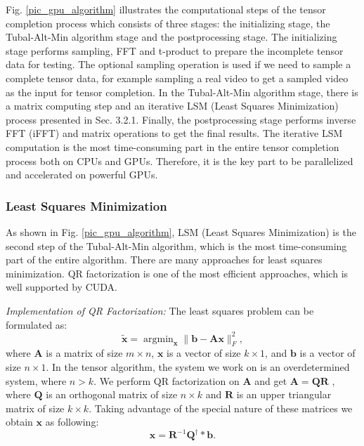 \documentclass[format=acmsmall, review=false, screen=true]{acmart}
\begin{document}
Fig. \ref{pic_gpu_algorithm} illustrates the computational steps of the tensor completion process which consists of three stages: the initializing stage, the Tubal-Alt-Min algorithm stage and the postprocessing stage. The initializing stage performs sampling, FFT and t-product to prepare the incomplete tensor data for testing. The optional sampling operation is used if we need to sample a complete tensor data, for example sampling a real video to get a sampled video as the input for tensor completion. In the Tubal-Alt-Min algorithm stage, there is a matrix computing step and an iterative LSM (Least Squares Minimization) process presented in Sec. 3.2.1. Finally, the postprocessing stage performs inverse FFT (iFFT) and matrix operations to get the final results. The iterative LSM computation is the most time-consuming part in the entire tensor completion process both on CPUs and GPUs. Therefore, it is the key part to be parallelized and accelerated on powerful GPUs.

\subsubsection{Least Squares Minimization}
As shown in Fig. \ref{pic_gpu_algorithm}, LSM (Least Squares Minimization) is the second step of the Tubal-Alt-Min algorithm, which is the most time-consuming part of the entire algorithm. There are many approaches for least squares minimization. QR factorization is one of the most efficient approaches, which is well supported by CUDA.

\textit{Implementation of QR Factorization:}
The least squares problem can be formulated as:
\[
\widetilde{\mathbf{x}} = \mathop{\arg \min}_{\mathbf{x}} \| \mathbf{b} - \mathbf{A} \mathbf{x} \|^2_F,
\]
where $\mathbf{A}$ is a matrix of size $m \times n$, $\mathbf{x}$ is a vector
of size $k \times 1$, and $\mathbf{b}$ is a vector of size $n \times 1$. In the tensor
algorithm, the system we work on is an overdetermined system, where $n >
 k$.
 We perform QR factorization on $\mathbf{A}$ and get $\mathbf{A} = \mathbf{Q}\mathbf{R}$ , where $\mathbf{Q}$ is an
 orthogonal matrix of size $n \times k $ and $\mathbf{R}$ is an upper triangular matrix of size $k \times k$. Taking advantage of the special nature of these matrices we obtain $\mathbf{x}$
as following:
\[
\mathbf{x} = \mathbf{R}^{-1}\mathbf{Q}^{\dagger} \ast \mathbf{b}.
\]
\end{document}
